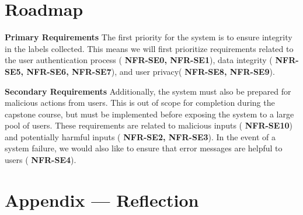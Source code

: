 \documentclass{article}
\begin{document}
\section{Roadmap}

\textbf{Primary Requirements}
The first priority for the system is to ensure integrity in the labels collected. This means we will first prioritize requirements
related to the user authentication process (
\textbf{NFR-SE0, NFR-SE1}), data integrity (
  \textbf{NFR-SE5, NFR-SE6, NFR-SE7}), and user privacy(
    \textbf{NFR-SE8, NFR-SE9}).

\textbf{Secondary Requirements}
Additionally, the system must also be prepared for malicious actions from users. This is out of scope for completion during the capstone course, but must be implemented
before exposing the system to a large pool of users. These requirements are related to malicious inputs (
  \textbf{NFR-SE10}) and potentially harmful inputs (
    \textbf{NFR-SE2, NFR-SE3}). In the event of a system failure, we would also like to ensure that error messages are helpful to users (
      \textbf{NFR-SE4}).

\newpage{}

\section*{Appendix --- Reflection}


\end{document}
